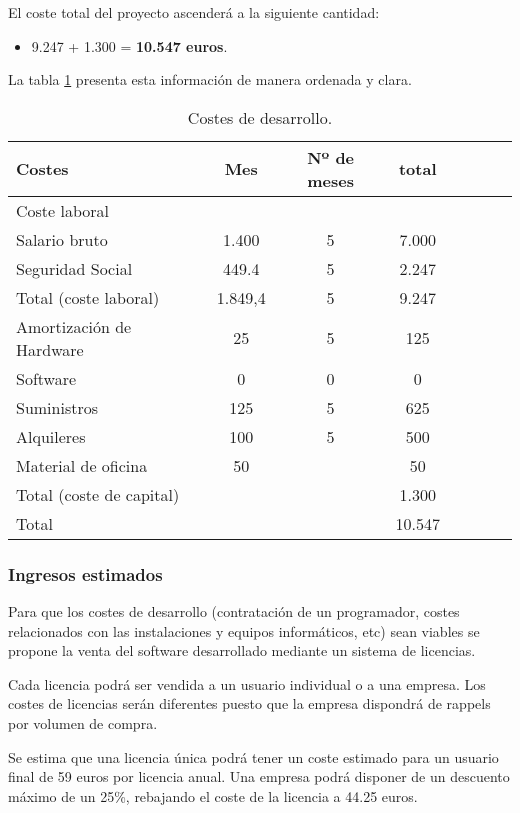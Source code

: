 El coste total del proyecto ascenderá a la siguiente cantidad:

\begin{itemize}
	\item 9.247 + 1.300 = \textbf{10.547 euros}.
\end{itemize}

La tabla \ref{table:costes} presenta esta información de manera ordenada y clara.

\begin{table}
	\centering
		\begin{tabular}{l*{6}{c}r}
		\hline
			Costes                & Mes & Nº de meses & total \\
		\hline
			Coste laboral 	  	  &		  &  &   \\
			Salario bruto         & 1.400 & 5  & 7.000  \\
			Seguridad Social      & 449.4 & 5 & 2.247\\
		\hline
			Total (coste laboral)	& 1.849,4 & 5 & 9.247   \\
		\hline
			Amortización de Hardware	& 25 & 5 & 125  \\
			Software     & 0 & 0 & 0  \\
			Suministros     & 125 & 5 & 625  \\
			Alquileres     & 100 & 5 & 500  \\
			Material de oficina   & 50  &  & 50 \\
		\hline
			Total (coste de capital)     &  &  &  1.300 \\
		\hline
			Total     &  &  &  10.547  \\
		\hline
	\end{tabular}
	\caption{Costes de desarrollo.}
	\label{table:costes}
\end{table}

\subsubsection{Ingresos estimados}
Para que los costes de desarrollo (contratación de un programador, costes relacionados con las instalaciones y equipos informáticos, etc) sean viables se propone la venta del software desarrollado mediante un sistema de licencias.

Cada licencia podrá ser vendida a un usuario individual o a una empresa. Los costes de licencias serán diferentes puesto que la empresa dispondrá de rappels por volumen de compra.

Se estima que una licencia única podrá tener un coste estimado para un usuario final de 59 euros por licencia anual. Una empresa podrá disponer de un descuento máximo de un 25\%, rebajando el coste de la licencia a 44.25 euros.

